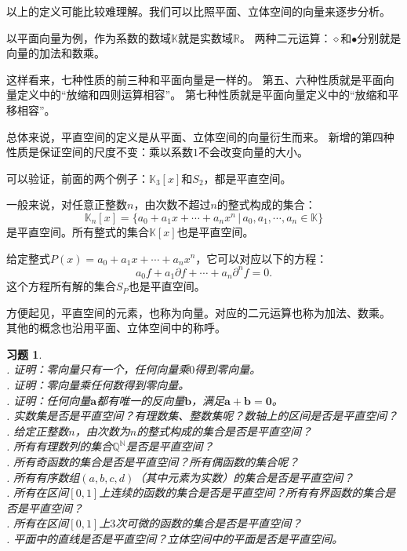 \documentclass[12pt,UTF8]{ctexbook}
\newtheorem{xt}{习题}[section]
\begin{document}
以上的定义可能比较难理解。我们可以比照平面、立体空间的向量来逐步分析。

以平面向量为例，作为系数的数域$\mathbb{K}$就是实数域$\mathbb{R}$。
两种二元运算：$\diamond$和$\bullet$分别就是向量的加法和数乘。

这样看来，七种性质的前三种和平面向量是一样的。
第五、六种性质就是平面向量定义中的“放缩和四则运算相容”。
第七种性质就是平面向量定义中的“放缩和平移相容”。

总体来说，平直空间的定义是从平面、立体空间的向量衍生而来。
新增的第四种性质是保证空间的尺度不变：乘以系数$1$不会改变向量的大小。

可以验证，前面的两个例子：$\mathbb{K}_3[x]$和$S_2$，都是平直空间。

一般来说，对任意正整数$n$，由次数不超过$n$的整式构成的集合：
$$ \mathbb{K}_n[x] = \{a_0 + a_1 x + \cdots + a_n x^n \, | \, a_0, a_1, \cdots , a_n \in \mathbb{K}\} $$
是平直空间。所有整式的集合$\mathbb{K}[x]$也是平直空间。

给定整式$P(x) = a_0 + a_1 x + \cdots + a_n x^n$，它可以对应以下的方程：
$$ a_0 f + a_1 \partial f + \cdots + a_n \partial^n f = 0. $$
这个方程所有解的集合$S_P$也是平直空间。

方便起见，平直空间的元素，也称为向量。对应的二元运算也称为加法、数乘。
其他的概念也沿用平面、立体空间中的称呼。

\begin{xt}
    \mbox{} \\
    . 证明：零向量只有一个，任何向量乘$0$得到零向量。\\
    . 证明：零向量乘任何数得到零向量。\\
    . 证明：任何向量$\mathbf{a}$都有唯一的反向量$\mathbf{b}$，满足$\mathbf{a} + \mathbf{b} = \mathbf{0}$。\\
    . 实数集是否是平直空间？有理数集、整数集呢？数轴上的区间是否是平直空间？\\
    . 给定正整数$n$，由次数为$n$的整式构成的集合是否是平直空间？\\
    . 所有有理数列的集合$\mathbb{Q}^\mathbb{N}$是否是平直空间？\\
    . 所有奇函数的集合是否是平直空间？所有偶函数的集合呢？\\
    . 所有有序数组$(a, b, c, d)$（其中元素为实数）的集合是否是平直空间？\\
    . 所有在区间$[0,1]$上连续的函数的集合是否是平直空间？所有有界函数的集合是否是平直空间？\\
    . 所有在区间$[0,1]$上$3$次可微的函数的集合是否是平直空间？\\
    . 平面中的直线是否是平直空间？立体空间中的平面是否是平直空间。
\end{xt}
\end{document}
